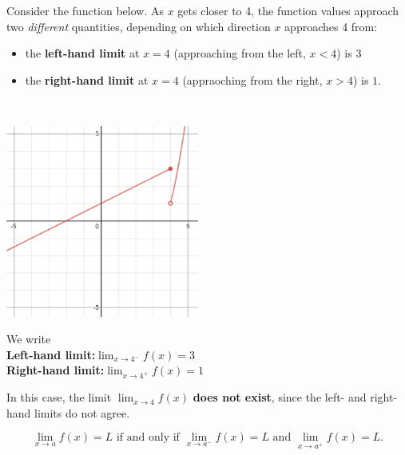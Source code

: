 \documentclass[11pt,reqno,final]{amsart}
\numberwithin{equation}{section}
\numberwithin{figure}{section}
\theoremstyle{definition} %
\begin{document}
Consider the function below. As $x$ gets closer to 4, the function values approach two \textit{different} quantities, depending on which direction $x$ approaches 4 from:
\begin{itemize}
\item the \textbf{left-hand limit} at $x = 4$ (approaching from the left, $x<4$) is $3$
\item the \textbf{right-hand limit} at $x = 4$ (appraoching from the right, $x>4$) is $1$.
\end{itemize}
\begin{minipage}{.5\textwidth}
        $ $\\
        \begin{center}
                \includegraphics[width=2.5in]{09-18P_jump.png}
        \end{center}        
\end{minipage}
\begin{minipage}{.5\textwidth}
        We write\\
        
        \textbf{Left-hand limit:}\quad $\displaystyle\lim_{x \to 4^-}f(x) = 3$\\[10pt]
        
        \textbf{Right-hand limit:}\quad $\displaystyle\lim_{x \to 4^+}f(x) = 1$
\end{minipage}

In this case, the limit $\displaystyle\lim_{x \to 4}f(x)$ \textbf{does not exist}, since the left- and right-hand limits do not agree.

\begin{framed}
        \[
                \displaystyle\lim_{x \to a}f(x) = L \mbox{ if and only if } \displaystyle\lim_{x \to a^-} f(x) = L \mbox{ and } \lim_{x \to a^+}f(x) = L.
        \]
\end{framed}
\end{document}
